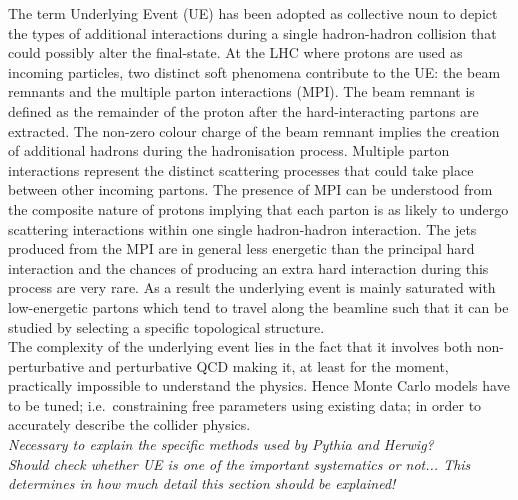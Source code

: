 The term Underlying Event (UE) has been adopted as collective noun to depict the types of additional interactions during a single hadron-hadron collision that could possibly alter the final-state. At the LHC where protons are used as incoming particles, two distinct soft phenomena contribute to the UE: the beam remnants and the multiple parton interactions (MPI).
The beam remnant is defined as the remainder of the proton after the hard-interacting partons are extracted. The non-zero colour charge of the beam remnant implies the creation of additional hadrons during the hadronisation process.
Multiple parton interactions represent the distinct scattering processes that could take place between other incoming partons. 
The presence of MPI can be understood from the composite nature of protons implying that each parton is as likely to undergo scattering interactions within one single hadron-hadron interaction.
The jets produced from the MPI  are in general less energetic than the principal hard interaction and the chances of producing an extra hard interaction during this process are very rare.
As a result the underlying event is mainly saturated with low-energetic partons which tend to travel along the beamline such that it can be studied by selecting a specific topological structure.
\\
The complexity of the underlying event lies in the fact that it involves both non-perturbative and perturbative QCD making it, at least for the moment, practically impossible to understand the physics. Hence Monte Carlo models have to be tuned; i.e.\ constraining free parameters using existing data; in order to accurately describe the collider physics.
\\
\textit{Necessary to explain the specific methods used by Pythia and Herwig?}
\\
\textit{Should check whether UE is one of the important systematics or not... This determines in how much detail this section should be explained!}
\\

